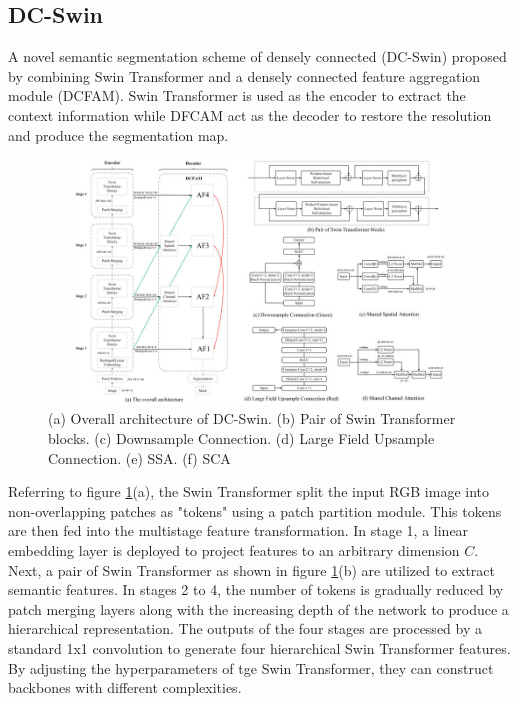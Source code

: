 \subsection{DC-Swin}
A novel semantic segmentation scheme of densely connected (DC-Swin) \cite{a-novel-transformer} proposed by combining Swin Transformer and a densely connected feature aggregation module (DCFAM). Swin Transformer is used as the encoder to extract the context information while DFCAM act as the decoder to restore the resolution and produce the segmentation map.

\FloatBarrier
\begin{figure}[ht]
\includegraphics[width=12.5cm, height=6.5cm]{images/dc-swin.png}
\centering
\caption{(a) Overall architecture of DC-Swin. (b) Pair of Swin Transformer blocks. (c) Downsample Connection. (d) Large Field Upsample Connection. (e) SSA. (f) SCA \protect\cite{a-novel-transformer}}
\label{fig:dc}
\end{figure}

Referring to figure \ref{fig:dc}(a), the Swin Transformer split the input RGB image into non-overlapping patches as "tokens" using a patch partition module. This tokens are then fed into the multistage feature transformation. In stage 1, a linear embedding layer is deployed to project features to an arbitrary dimension $C$. Next, a pair of Swin Transformer as shown in figure \ref{fig:dc}(b) are utilized to extract semantic features. In stages 2 to 4, the number of tokens is gradually reduced by patch merging layers along with the increasing depth of the network to produce a hierarchical representation. The outputs of the four stages are processed by a standard 1x1 convolution to generate four hierarchical Swin Transformer features. By adjusting the hyperparameters of tge Swin Transformer, they can construct backbones with different complexities.

